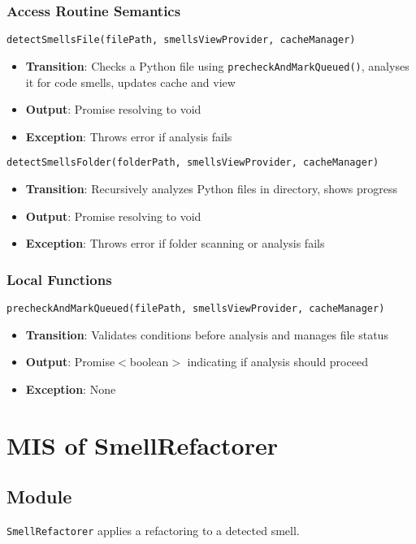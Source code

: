 \documentclass[12pt, titlepage]{article}
\begin{document}
\subsubsection{Access Routine Semantics}
\texttt{detectSmellsFile(filePath, smellsViewProvider, cacheManager)}
\begin{itemize}
\item \textbf{Transition}: Checks a Python file using \texttt{precheckAndMarkQueued()}, analyses it for code smells, updates cache and view
\item \textbf{Output}: Promise resolving to void
\item \textbf{Exception}: Throws error if analysis fails
\end{itemize}

\texttt{detectSmellsFolder(folderPath, smellsViewProvider, cacheManager)}
\begin{itemize}
\item \textbf{Transition}: Recursively analyzes Python files in directory, shows progress
\item \textbf{Output}: Promise resolving to void
\item \textbf{Exception}: Throws error if folder scanning or analysis fails
\end{itemize}

\subsubsection{Local Functions}
\texttt{precheckAndMarkQueued(filePath, smellsViewProvider, cacheManager)}
\begin{itemize}
\item \textbf{Transition}: Validates conditions before analysis and manages file status
\item \textbf{Output}: Promise$<$boolean$>$ indicating if analysis should proceed
\item \textbf{Exception}: None
\end{itemize}

\section{MIS of SmellRefactorer}

\subsection{Module}
\texttt{SmellRefactorer} applies a refactoring to a detected smell.
\end{document}
